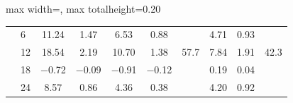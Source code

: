 \begin{table}[htbp]
{\begin{adjustbox}{max width=\linewidth, max totalheight=0.20\textheight}
\begin{tabular}{llcccccccc}
 & 6 & \phantom{$-$}11.24 & \phantom{$-$}1.47 & \phantom{$-$0}6.53 & \phantom{$-$}0.88 &  & \phantom{$-$0}4.71 & \phantom{$-$}0.93 &  \\
 & 12 & \phantom{$-$}18.54 & \phantom{$-$}2.19 & \phantom{$-$}10.70 & \phantom{$-$}1.38 & 57.7 & \phantom{$-$0}7.84 & \phantom{$-$}1.91 & 42.3 \\
 & 18 & \phantom{0}$-$0.72 & $-$0.09 & \phantom{0}$-$0.91 & $-$0.12 &  & \phantom{$-$0}0.19 & \phantom{$-$}0.04 &  \\
 & 24 & \phantom{$-$0}8.57 & \phantom{$-$}0.86 & \phantom{$-$0}4.36 & \phantom{$-$}0.38 &  & \phantom{$-$0}4.20 & \phantom{$-$}0.92 &  \\
\bottomrule
\end{tabular}
\end{adjustbox}
}
\end{table}

